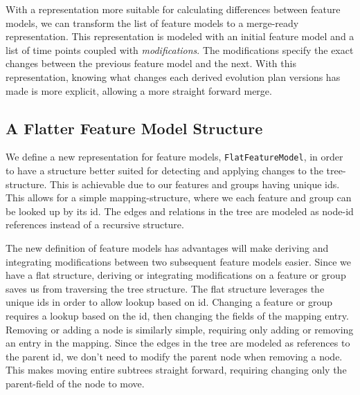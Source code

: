 \documentclass[a4paper,english]{ifimaster}
\begin{document}
With a representation more suitable for calculating differences between feature models, we can transform the list of feature models to a merge-ready representation. This representation is modeled with an initial feature model and a list of time points coupled with \textit{modifications}. The modifications specify the exact changes between the previous feature model and the next. With this representation, knowing what changes each derived evolution plan versions has made is more explicit, allowing a more straight forward merge.



\subsection{A Flatter Feature Model Structure}%
\label{sub:a_flatter_feature_model_structure}

We define a new representation for feature models, \texttt{FlatFeatureModel}, in order to have a structure better suited for detecting and applying changes to the tree-structure. This is achievable due to our features and groups having unique ids. This allows for a simple mapping-structure, where we each feature and group can be looked up by its id. The edges and relations in the tree are modeled as node-id references instead of a recursive structure.

The new definition of feature models has advantages will make deriving and integrating modifications between two subsequent feature models easier. Since we have a flat structure, deriving or integrating modifications on a feature or group saves us from traversing the tree structure. The flat structure leverages the unique ids in order to allow lookup based on id. Changing a feature or group requires a lookup based on the id, then changing the fields of the mapping entry. Removing or adding a node is similarly simple, requiring only adding or removing an entry in the mapping. Since the edges in the tree are modeled as references to the parent id, we don't need to modify the parent node when removing a node. This makes moving entire subtrees straight forward, requiring changing only the parent-field of the node to move.
\end{document}
